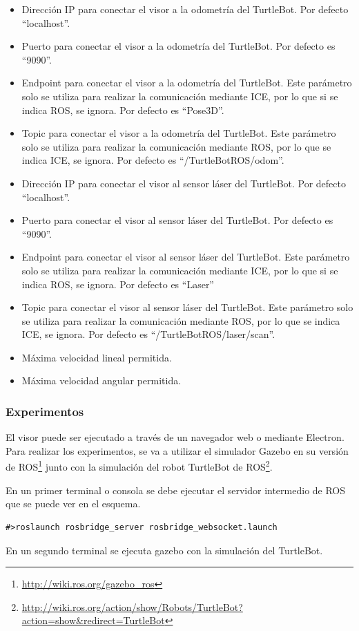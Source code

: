 \begin{itemize}
\item Dirección IP para conectar el visor a la odometría del TurtleBot. Por defecto ``localhost''.
\item Puerto para conectar el visor a la odometría del TurtleBot. Por defecto es ``9090''.
\item Endpoint para conectar el visor a la odometría del TurtleBot. Este parámetro solo se utiliza para realizar la comunicación mediante ICE, por lo que si se indica ROS, se ignora. Por defecto es ``Pose3D''.
\item Topic para conectar el visor a la odometría del TurtleBot. Este parámetro solo se utiliza para realizar la comunicación mediante ROS, por lo que se indica ICE, se ignora. Por defecto es ``/TurtleBotROS/odom''.
\item Dirección IP para conectar el visor al sensor láser del TurtleBot. Por defecto ``localhost''.
\item Puerto para conectar el visor al sensor láser del TurtleBot. Por defecto es ``9090''.
\item Endpoint para conectar el visor al sensor láser del TurtleBot. Este parámetro solo se utiliza para realizar la comunicación mediante ICE, por lo que si se indica ROS, se ignora. Por defecto es ``Laser''
\item Topic para conectar el visor al sensor láser del TurtleBot. Este parámetro solo se utiliza para realizar la comunicación mediante ROS, por lo que se indica ICE, se ignora. Por defecto es ``/TurtleBotROS/laser/scan''.
\item Máxima velocidad lineal permitida.
\item Máxima velocidad angular permitida.
\end{itemize}

\subsubsection{Experimentos}
El visor puede ser ejecutado a través de un navegador web o mediante Electron. Para realizar los experimentos, se va a utilizar el simulador Gazebo en su versión de ROS\footnote{\url{http://wiki.ros.org/gazebo_ros}} junto con la simulación del robot TurtleBot de ROS\footnote{\url{http://wiki.ros.org/action/show/Robots/TurtleBot?action=show&redirect=TurtleBot}}.

En un primer terminal o consola se debe ejecutar el servidor intermedio de ROS que se puede ver en el esquema.
\begin{lstlisting}[caption= Ejecución del servidor intermedio, label=cod.servidorintermedioTurtleBot]
#>roslaunch rosbridge_server rosbridge_websocket.launch
\end{lstlisting}
En un segundo terminal se ejecuta gazebo con la simulación del TurtleBot.

